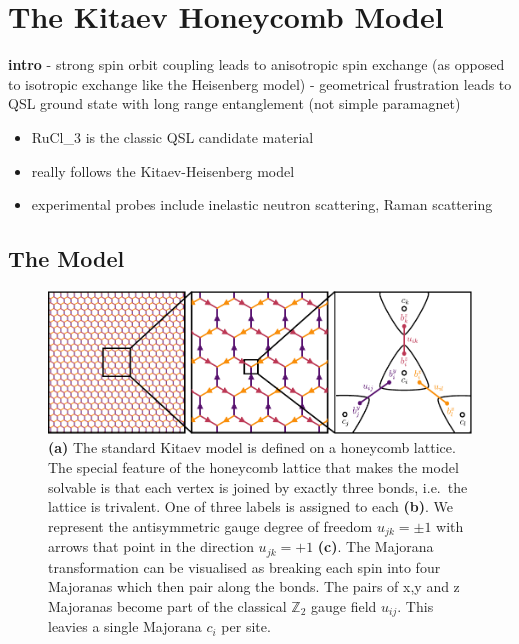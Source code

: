 \hypertarget{the-kitaev-honeycomb-model}{%
\section{The Kitaev Honeycomb Model}\label{the-kitaev-honeycomb-model}}

\textbf{intro} - strong spin orbit coupling leads to anisotropic spin exchange (as opposed to isotropic exchange like the Heisenberg model) - geometrical frustration leads to QSL ground state with long range entanglement (not simple paramagnet)

\begin{itemize}
\tightlist
\item
  RuCl\_3 is the classic QSL candidate material
\item
  really follows the Kitaev-Heisenberg model
\item
  experimental probes include inelastic neutron scattering, Raman scattering
\end{itemize}

\hypertarget{the-model}{%
\subsection{The Model}\label{the-model}}

\hypertarget{fig:intro_figure_by_hand}{%
\begin{figure}
\centering
\includegraphics[width=1\textwidth,height=\textheight]{figure_code/amk_chapter/intro/honeycomb_zoom/intro_figure_by_hand}
\caption[{The Kitaev Honeycomb Model}]{\textbf{(a)} The standard Kitaev model is defined on a honeycomb lattice. The special feature of the honeycomb lattice that makes the model solvable is that each vertex is joined by exactly three bonds, i.e.~the lattice is trivalent. One of three labels is assigned to each \textbf{(b)}. We represent the antisymmetric gauge degree of freedom \(u_{jk} = \pm 1\) with arrows that point in the direction \(u_{jk} = +1\) \textbf{(c)}. The Majorana transformation can be visualised as breaking each spin into four Majoranas which then pair along the bonds. The pairs of x,y and z Majoranas become part of the classical \(\mathbb{Z}_2\) gauge field \(u_{ij}\). This leavies a single Majorana \(c_i\) per site.}
\label{fig:intro_figure_by_hand}
\end{figure}
}

